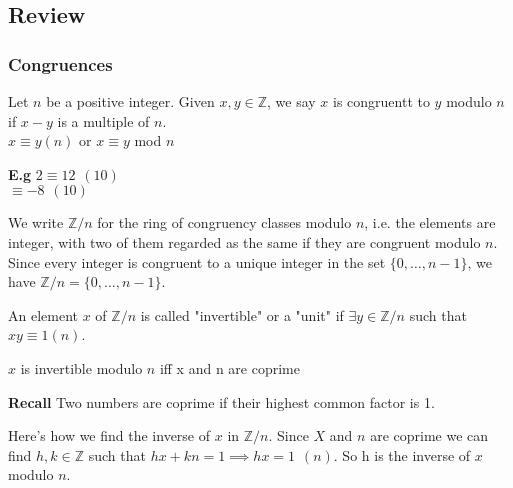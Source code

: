 \documentclass[11pt]{article}
\begin{document}
	\subsection{Review}

	\subsubsection{Congruences}
	Let $n$ be a positive integer. Given $x,y \in \mathbb{Z}$, we say $x$ is congruentt to $y$ modulo $n$ if $x-y$ is a multiple of $n$.\\

	$x \equiv y (n)$  \hspace{10pt} or \hspace{10pt} $x \equiv y$ mod $n$
	
	\begin{flushleft}
		\textbf{E.g} \hspace{10pt} $2 \equiv 12 \hspace{5pt} (10)$\\
		\hspace{42pt}$\equiv  -8 \hspace{5pt} (10)$
	\end{flushleft}
	

	We write $\mathbb{Z}/n$ for the ring of congruency classes modulo $n$, i.e. the elements are integer, with two of them regarded as the same if they are congruent modulo $n$.\\

	Since every integer is congruent to a unique integer in the set $\{0,\dots, n-1\}$, we have $\mathbb{Z}/n = \{0,\dots, n-1\}$.

	An element $x$ of $\mathbb{Z}/n $ is called "invertible" or a "unit" if $\exists y \in \mathbb{Z}/n$ such that $xy \equiv 1 (n)$.

	\begin{theorem}
$x$ is invertible modulo $n$ iff x and n are coprime
	\end{theorem}
	\textbf{Recall} Two numbers are coprime if their highest common factor is 1.

	Here's how we find the inverse of $x$ in $\mathbb{Z}/n$. Since $X$ and $n$ are coprime we can find $h, k \in \mathbb{Z}$ such that $hx+kn = 1 \implies hx = 1 \hspace{5pt} (n)$. So h is the inverse of $x$ modulo $n$.
\end{document}
